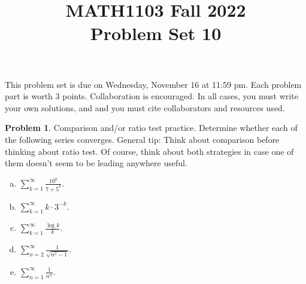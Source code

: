 \documentclass[11pt,oneside]{amsart}
\title{MATH1103 Fall 2022\\
Problem Set 10}
\theoremstyle{definition}
\newtheorem{problem}{Problem}
\theoremstyle{plain}
\begin{document}
\maketitle
This problem set is due on Wednesday, November 16 at 11:59 pm. Each problem part is worth 3 points. Collaboration is encouraged. In all cases, you must write your own solutions, and and you must cite collaborators and resources used.

\begin{problem}
Comparison and/or ratio test practice. Determine whether each of the following series converges. General tip: Think about comparison before thinking about ratio test. Of course, think about both strategies in case one of them doesn't seem to be leading anywhere useful.
\begin{enumerate}[(a)]
  \item $\displaystyle\sum_{k=1}^\infty{\frac{10^k}{7+5^k}}$.
  \item $\displaystyle\sum_{k=1}^\infty k\cdot 3^{-k}$.
  \item $\displaystyle\sum_{k=1}^\infty\frac{\log k}k$.
  \item $\displaystyle\sum_{n=2}^\infty\frac 1{\sqrt{n^2-1}}$.
  \item $\displaystyle\sum_{n=1}^\infty\frac 1{n^n}$.
\end{enumerate}
\end{problem}
\end{document}

